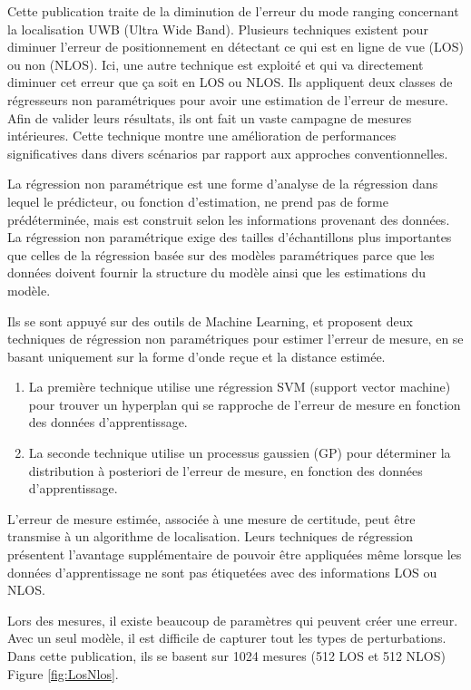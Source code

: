 Cette publication traite de la diminution de l'erreur du mode ranging concernant la localisation UWB (Ultra Wide Band). Plusieurs techniques existent pour diminuer l'erreur de positionnement en détectant ce qui est en ligne de vue (LOS) ou non (NLOS). Ici, une autre technique est exploité et qui va directement diminuer cet erreur que ça soit en LOS ou NLOS. Ils appliquent deux classes de régresseurs non paramétriques pour avoir une estimation de l'erreur de mesure. Afin de valider leurs résultats, ils ont fait un vaste campagne de mesures intérieures. Cette technique montre une amélioration de performances significatives dans divers scénarios par rapport aux approches conventionnelles. 

La régression non paramétrique est une forme d'analyse de la régression dans lequel le prédicteur, ou fonction d'estimation, ne prend pas de forme prédéterminée, mais est construit selon les informations provenant des données. La régression non paramétrique exige des tailles d'échantillons plus importantes que celles de la régression basée sur des modèles paramétriques parce que les données doivent fournir la structure du modèle ainsi que les estimations du modèle. \cite{WIKI1}

Ils se sont appuyé sur des outils de Machine Learning, et proposent deux techniques de régression non paramétriques pour estimer l’erreur de mesure, en se basant uniquement sur la forme d’onde reçue et la distance estimée.

\begin{enumerate}
	\item La première technique utilise une régression SVM (support vector machine) pour trouver un hyperplan qui se rapproche de l'erreur de mesure en fonction des données d'apprentissage. 
	\item La seconde technique utilise un processus gaussien (GP) pour déterminer la distribution à posteriori de l'erreur de mesure, en fonction des données d'apprentissage. 
\end{enumerate}

L'erreur de mesure estimée, associée à une mesure de certitude, peut être transmise à un algorithme de localisation. Leurs techniques de régression présentent l'avantage supplémentaire de pouvoir être appliquées même lorsque les données d'apprentissage ne sont pas étiquetées avec des informations LOS ou NLOS.

Lors des mesures, il existe beaucoup de paramètres qui peuvent créer une erreur. Avec un seul modèle, il est difficile de capturer tout les types de perturbations. Dans cette publication, ils se basent sur 1024 mesures (512 LOS et 512 NLOS) Figure \ref{fig:LosNlos}.

